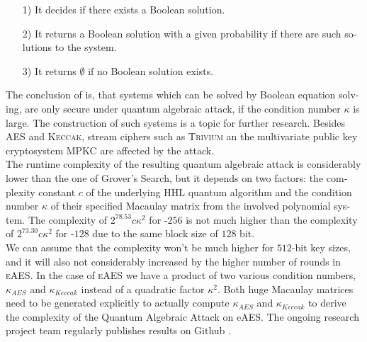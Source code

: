 \documentclass[a4paper,11pt]{article}
\begin{document}
\begin{otherlanguage}{english}
\begin{itemize} [noitemsep, nolistsep]
  \item[1)] It decides if there exists a Boolean solution.
  \vspace{0.1cm}
  \item[2)] It returns a Boolean solution with a given probability if there are such solutions to the system.
  \vspace{0.1cm}
  \item[3)] It returns $\emptyset$ if no Boolean solution exists.
\end{itemize}
\vspace{0.5cm}

\noindent
The conclusion of \cite{QAA} is, that systems which can be solved by Boolean equation solving, are only secure under quantum algebraic attack, if the condition number $\kappa$ is large. The construction of such systems is a topic for further research. Besides \textsc{AES} and \textsc{Keccak}, stream ciphers such as \textsc{Trivium} an the multivariate public key cryptosystem \textsc{MPKC} are affected by the attack. \\

\noindent
The runtime complexity of the resulting quantum algebraic attack is considerably lower than the one of Grover's Search, but it depends on two factors: the complexity constant $c$ of the underlying \textsc{HHL} quantum algorithm \cite{HHL} and the condition number $\kappa$ of their specified Macaulay matrix from the involved polynomial system. The complexity of $2^{78.53}c\kappa^2$ for -$256$ is not much higher than the complexity of $2^{73.30}c\kappa^2$ for -$128$ due to the same block size of $128$ bit. \\

We can assume that the complexity won't be much higher for $512$-bit key sizes, and it will also not considerably increased by the higher number of rounds in \textsc{eAES}. In the case of \textsc{eAES} we have a product of two various condition numbers, $\kappa_{AES}$ and $\kappa_{Keccak}$ instead of a quadratic factor $\kappa^2$. Both huge Macaulay matrices need to be generated explicitly to actually compute $\kappa_{AES}$ and $\kappa_{Keccak}$ to derive the complexity of the Quantum Algebraic Attack on eAES. The ongoing research project team regularly publishes results on Github \cite{XBO}.\\




\end{otherlanguage}
\end{document}
